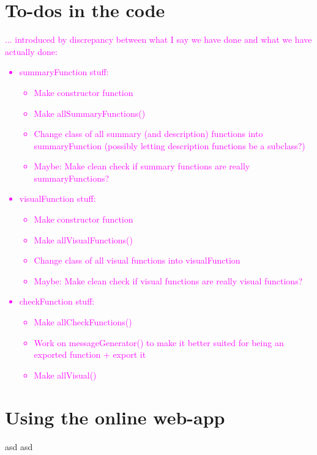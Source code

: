 \documentclass[article]{jss}
\newcommand{\hl}[1]{\textcolor{magenta}{#1}}
\begin{document}
\section{To-dos in the code}
\hl{ ...  introduced by discrepancy between what I say we have done and what we have actually done:
\begin{itemize}
\item summaryFunction stuff:
	\begin{itemize}
		\item Make constructor function
		\item Make allSummaryFunctions()
		\item Change class of all summary (and description) functions into summaryFunction (possibly letting description functions be a subclass?)
		\item Maybe: Make clean check if summary functions are really summaryFunctions?
	\end{itemize}
\item visualFunction stuff:
	\begin{itemize}
		\item Make constructor function
		\item Make allVisualFunctions()
		\item Change class of all visual functions into visualFunction
		\item Maybe: Make clean check if visual functions are really visual functions?
	\end{itemize}
\item checkFunction stuff:
	\begin{itemize}
		\item Make allCheckFunctions()
		\item Work on messageGenerator() to make it better suited for being an exported function + export it
		\item Make allVisual()
	\end{itemize}
\end{itemize}
}





\section{Using the online web-app} \label{sec:web-app}

asd
asd
\end{document}
